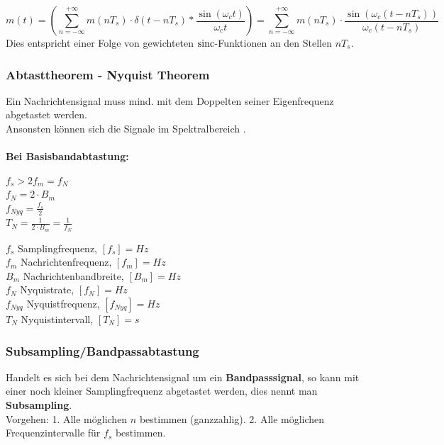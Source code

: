 \begin{equation*}
	m(t) = \left({\sum_{n=-\infty}^{+\infty}m(nT_s)\cdot\delta(t-nT_s)\ast\frac{\sin(\omega_ct)}{\omega_ct}}\right) = 
	\sum_{n=-\infty}^{+\infty}m(nT_s)\cdot\frac{\sin(\omega_c(t-nT_s))}{\omega_c(t-nT_s)}
\end{equation*}
Dies entspricht einer Folge von gewichteten $\operatorname{sinc}$-Funktionen an den Stellen $nT_s$.

\subsubsection{Abtasttheorem - Nyquist Theorem}
Ein Nachrichtensignal muss mind. mit dem Doppelten seiner Eigenfrequenz abgetastet werden. \\
Ansonsten können sich die Signale im Spektralbereich .  
\\ \\
\textbf{Bei Basisbandabtastung:}\\
\hspace*{3cm}
\begin{minipage}[t][2.0cm][c]{8cm}
	$ f_s > 2 f_m  = f_N$ \\
	$ f_N = 2 \cdot B_m $ \\
	$ f_{Nyq} = \frac{f_s}{2}$ \\
	$ T_N = \frac{1}{2\cdot B_m} = \frac{1}{f_N} $
\end{minipage}
\begin{minipage}[t][2.5cm][c]{10cm}
	$f_s$ Samplingfrequenz, $[f_s] = Hz$ \\
	$f_m$ Nachrichtenfrequenz, $[f_m] = Hz$ \\
	$B_m$ Nachrichtenbandbreite, $[B_m] = Hz$ \\
	$f_N$ Nyquistrate, $[f_N] = Hz$ \\
	$f_{Nyq}$ Nyquistfrequenz, $[f_{Nyq}] = Hz$ \\
	$T_N$ Nyquistintervall, $[T_N] = s$ \\	
\end{minipage}

\subsubsection{Subsampling/Bandpassabtastung}
Handelt es sich bei dem Nachrichtensignal um ein \textbf{Bandpasssignal}, so kann mit einer noch
kleiner Samplingfrequenz abgetastet werden, dies nennt man \textbf{Subsampling}. \\
Vorgehen: 1. Alle möglichen $n$ bestimmen (ganzzahlig). 2. Alle möglichen Frequenzintervalle für
$f_s$ bestimmen.

